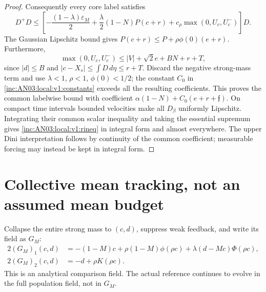\documentclass[11pt]{article}
\numberwithin{equation}{section}
\theoremstyle{remark}\newtheorem{remark}[theorem]{Remark}
\newcommand{\dd}{\,d}\newcommand{\E}{\mathbb E}
\begin{document}
\begin{proof}
Consequently every core label satisfies
\[
 D^+D\le\left[-\frac{(1-\lambda)\varepsilon_M}{2}
   +\frac\lambda2(1-N)P(c+r)
   +c_\rho\max(0,U_c,U_c^-)\right]D.
\]
The Gaussian Lipschitz bound gives
$P(c+r)\le P+\rho\phi(0)(e+r)$. Furthermore,
\[
 \max(0,U_c,U_c^-)
 \le |V|+\sqrt2e+BN+r+T,
\]
since $|d|\le B$ and $|c-X_s|\le\int D\dd\eta\le r+T$.
Discard the negative strong-mass term and use $\lambda<1$, $\rho<1$,
$\phi(0)<1/2$; the constant $C_0$ in
\eqref{inc:AN03:local:v1:constants} exceeds all the resulting
coefficients. This proves the common labelwise bound with coefficient
$\alpha(1-N)+C_0(e+r+\mathfrak f)$.
On compact time intervals bounded velocities make all $D_\beta$
uniformly Lipschitz. Integrating their common scalar inequality and
taking the essential supremum gives \eqref{inc:AN03:local:v1:rineq}
in integral form and almost everywhere. The upper Dini interpretation
follows by continuity of the common coefficient; measurable forcing
may instead be kept in integral form.
\end{proof}

\section{Collective mean tracking, not an assumed mean budget}
\label{inc:AN03:local:v1:mean}
Collapse the entire strong mass to $(c,d)$, suppress weak feedback,
and write its field as $G_M$:
\begin{align}
 2(G_M)_1(c,d)&=-(1-M)c+\rho(1-M)\phi(\rho c)
                 +\lambda(d-Mc)\Phi(\rho c),\nonumber\\
 2(G_M)_2(c,d)&=-d+\rho K(\rho c).\label{inc:AN03:local:v1:coherentfield}
\end{align}
This is an analytical comparison field. The actual reference continues
to evolve in the full population field, not in $G_M$.
\end{document}
